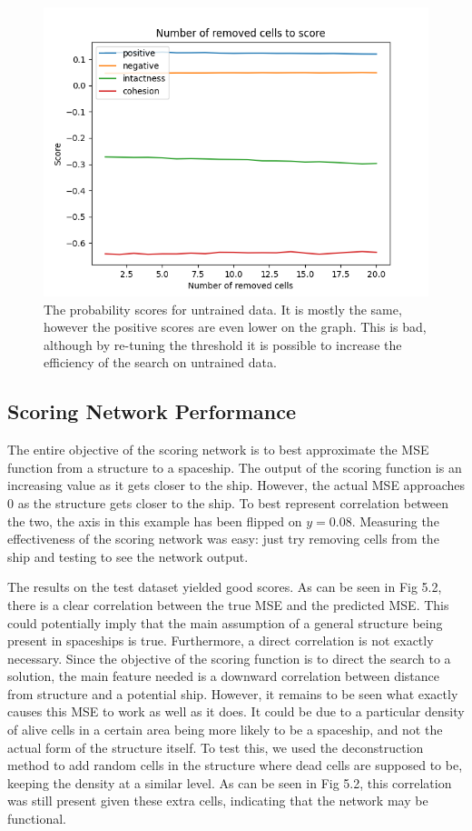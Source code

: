 \documentclass{l4proj}
\begin{document}

\begin{figure}[h!]
\centering
\includegraphics[width=0.7\linewidth]{dissertation/images/graphs/n_removed_cells_score_probability_analysis_test.png}
\caption{The probability scores for untrained data. It is mostly the same, however the positive scores are even lower on the graph. This is bad, although by re-tuning the threshold it is possible to increase the efficiency of the search on untrained data.}
\label{fig:subim1}
\end{figure}


\subsection{Scoring Network Performance}

The entire objective of the scoring network is to best approximate the MSE function from a structure to a spaceship. The output of the scoring function is an increasing value as it gets closer to the ship. However, the actual MSE approaches 0 as the structure gets closer to the ship. To best represent correlation between the two, the axis in this example has been flipped on $y = 0.08$. Measuring the effectiveness of the scoring network was easy: just try removing cells from the ship and testing to see the network output.

 The results on the test dataset yielded good scores. As can be seen in Fig 5.2, there is a clear correlation between the true MSE and the predicted MSE. This could potentially imply that the main assumption of  a general structure being present in spaceships is true. Furthermore, a direct correlation is not exactly necessary. Since the objective of the scoring function is to direct the search to a solution, the main feature needed is a downward correlation between distance from structure and a potential ship. However, it remains to be seen what exactly causes this MSE to work as well as it does. It could be due to a particular density of alive cells in a certain area being more likely to be a spaceship, and not the actual form of the structure itself. To test this, we used the deconstruction method to add random cells in the structure where dead cells are supposed to be, keeping the density at a similar level. As can be seen in Fig 5.2, this correlation was still present given these extra cells, indicating that the network may be functional.
\end{document}
